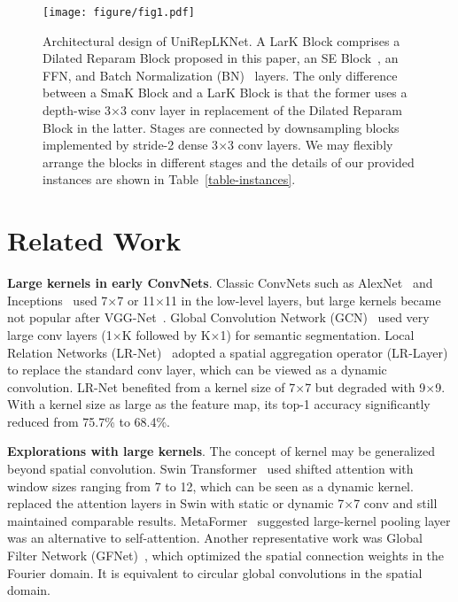 \documentclass[10pt,twocolumn,letterpaper]{article}
\begin{document}
\begin{figure}
    \begin{center}
            \texttt{[image: figure/fig1.pdf]}
        \vspace{-2mm}
        \caption{Architectural design of UniRepLKNet. A LarK Block comprises a Dilated Reparam Block proposed in this paper, an SE Block~\cite{hu2018squeeze}, an FFN, and Batch Normalization (BN)~\cite{ioffe2015batch} layers. The only difference between a SmaK Block and a LarK Block is that the former uses a depth-wise 3$\times$3 conv layer in replacement of the Dilated Reparam Block in the latter. Stages are connected by downsampling blocks implemented by stride-2 dense 3$\times$3 conv layers. We may flexibly arrange the blocks in different stages and the details of our provided instances are shown in Table~\ref{table-instances}.}
        \label{fig-arch}
        \vspace{-0.3in}
    \end{center}
\end{figure}


 \section{Related Work}

\noindent\textbf{Large kernels in early ConvNets}. Classic ConvNets such as AlexNet~\cite{krizhevsky2012imagenet} and Inceptions~\cite{szegedy2015going,szegedy2016rethinking,szegedy2017inception} used 7$\times$7 or 11$\times$11 in the low-level layers, but large kernels became not popular after VGG-Net~\cite{simonyan2014very}. Global Convolution Network (GCN)~\cite{peng2017large} used very large conv layers (1$\times$K followed by K$\times$1) for semantic segmentation. Local Relation Networks (LR-Net)~\cite{hu2019local} adopted a spatial aggregation operator (LR-Layer) to replace the standard conv layer, which can be viewed as a dynamic convolution. LR-Net benefited from a kernel size of 7$\times$7 but degraded with 9$\times$9. With a kernel size as large as the feature map, its top-1 accuracy significantly reduced from 75.7\% to 68.4\%. 

\noindent\textbf{Explorations with large kernels}. The concept of kernel may be generalized beyond spatial convolution. Swin Transformer~\cite{swin} used shifted attention with window sizes ranging from 7 to 12, which can be seen as a dynamic kernel. \citet{han2021demystifying} replaced the attention layers in Swin with static or dynamic 7$\times$7 conv and still maintained comparable results. MetaFormer~\cite{yu2021metaformer} suggested large-kernel pooling layer was an alternative to self-attention. Another representative work was Global Filter Network (GFNet)~\cite{rao2021global}, which optimized the spatial connection weights in the Fourier domain. It is equivalent to circular global convolutions in the spatial domain. 
\end{document}
